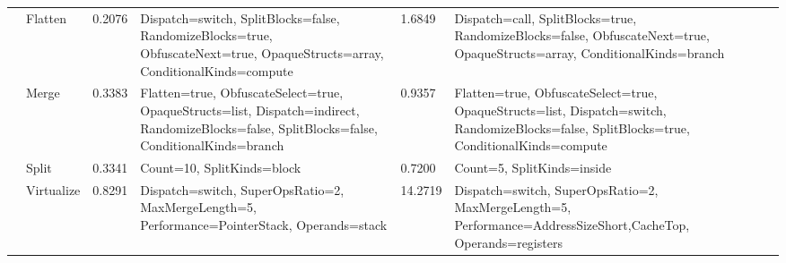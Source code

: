 \begin{table*}[p]
\begin{footnotesize}
\begin{tabular}{|p{1.5cm}|l|l|p{5cm}|l|p{5cm}|}
                                                                               & Flatten                                                                & 0.2076                                                    &  Dispatch=switch, SplitBlocks=false, RandomizeBlocks=true, ObfuscateNext=true, OpaqueStructs=array, ConditionalKinds=compute                                                             & 1.6849                                                    &  Dispatch=call, SplitBlocks=true, RandomizeBlocks=false, ObfuscateNext=true, OpaqueStructs=array, ConditionalKinds=branch                                                                    \\ \cline{2-6} 
                                                                               & Merge                                                                  & 0.3383                                                    &  Flatten=true, ObfuscateSelect=true, OpaqueStructs=list, Dispatch=indirect, RandomizeBlocks=false, SplitBlocks=false, ConditionalKinds=branch                                            & 0.9357                                                    &  Flatten=true, ObfuscateSelect=true, OpaqueStructs=list, Dispatch=switch, RandomizeBlocks=false, SplitBlocks=true, ConditionalKinds=compute                                                  \\ \cline{2-6} 
                                                                               & Split                                                                  & 0.3341                                                    &  Count=10, SplitKinds=block                                                                                                                                                              & 0.7200                                                    &  Count=5, SplitKinds=inside                                                                                                                                                                  \\ \cline{2-6} 
                                                                               & Virtualize                                                             & 0.8291                                                    &  Dispatch=switch, SuperOpsRatio=2, MaxMergeLength=5, Performance=PointerStack, Operands=stack                                                                                            & 14.2719                                                   &  Dispatch=switch, SuperOpsRatio=2, MaxMergeLength=5, Performance=AddressSizeShort,CacheTop, Operands=registers                                                                               \\ \hline

\end{tabular}
\end{footnotesize}
\end{table*}
